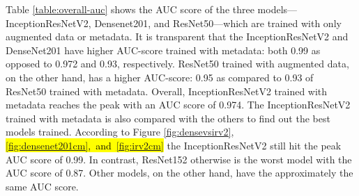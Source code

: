 \documentclass[sensors,article,accept,pdftex,moreauthors]{Definitions/mdpi}
\begin{document}
	
	Table \ref{table:overall-auc} shows the AUC score of the three models—InceptionResNetV2, Densenet201, and ResNet50—which are trained with only augmented data or metadata. It is transparent that the InceptionResNetV2 and DenseNet201 have higher AUC-score trained with metadata: both 0.99 as opposed to 0.972 and 0.93, respectively. ResNet50 trained with augmented data, on the other hand, has a higher AUC-score: 0.95 as compared to 0.93 of ResNet50 trained with metadata. Overall, InceptionResNetV2 trained with metadata reaches the peak with an AUC score of 0.974. The InceptionResNetV2 trained with metadata is also compared with the others to find out the best models trained. According to Figure \ref{fig:densevsirv2}, \hl{\mbox{\ref{fig:densenet201cm}, and \ref{fig:irv2cm}}} the InceptionResNetV2 still hit the peak AUC score of 0.99. In contrast, ResNet152 otherwise is the worst model with the AUC score of 0.87. Other models, on the other hand, have the approximately the same AUC score. 
	
\end{document}
